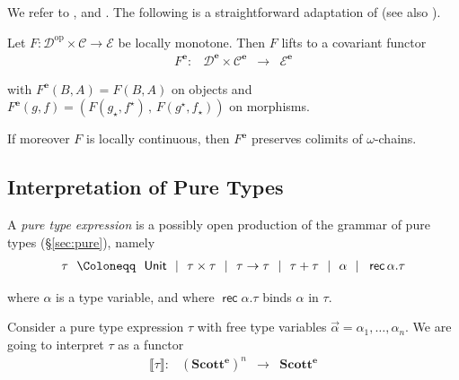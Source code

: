 \documentclass[%
  a4paper,
  UKenglish,
  cleveref,
  autoref,
  thm-restate,
  numberwithinsect,
]{lipics-v2021}
\newcommand\longto\longrightarrow
\newcommand\bnf\Coloneqq
\newcommand\gs{~~|~~}
\newcommand\I[1]{\llbracket #1 \rrbracket} %
\newcommand\cat\mathcal
\newcommand\op{{\mathrm{op}}}
\newcommand\ladj[1]{\ensuremath{{#1}^{\star}}}	%
\newcommand\radj[1]{\ensuremath{{#1}_{\star}}}	%
\newcommand\Scott{\mathbf{Scott}}
\newcommand\term[1]{\mathsf{#1}}
\newcommand\type[1]{\term{#1}}
\newcommand\arrow\to
\newcommand\Unit{\type{Unit}}
\newcommand\rec{\mathop{\type{rec}}}	%
\newcommand\TV{\alpha}		%
\newcommand\PT{\tau}		%
\newcommand\ep{{\mathbf{e}}}
\begin{document}
\noindent
We refer to \cite[Definition 5.2.5]{aj95chapter},
\cite[Definition 7.1.15]{ac98book}
and \cite[Definition 9.1]{streicher06book}.
%
The following is a straightforward adaptation of \cite[Proposition 7.1.19]{ac98book}
(see also \cite[Proposition 5.2.6]{aj95chapter}).

\begin{lemma}
\label{lem:proof:scott:lift}
Let
$F \colon \cat D^\op \times \cat C \to \cat E$
be locally monotone.
Then $F$ lifts to a covariant functor
\[
\begin{array}{*{4}{l}}
  F^\ep \colon
& \cat D^\ep \times \cat C^\ep
& \longto
& \cat E^\ep
\end{array}
\]


\noindent
with $F^\ep(B,A) = F(B,A)$ on objects and
$F^\ep(g,f) = (F(\radj g,\ladj f) \,,\, F(\ladj g,\radj f))$
on morphisms.

If moreover $F$ is locally continuous, then $F^\ep$
preserves colimits of $\omega$-chains.
\end{lemma}



\subsection{Interpretation of Pure Types}

A \emph{pure type expression} is a possibly open production of the
grammar of pure types (\S\ref{sec:pure}), namely
\[
\begin{array}{r @{\ \ }c@{\ \ } l}
    \PT
&   \bnf
&   \Unit
\gs \PT \times \PT
\gs \PT \arrow \PT
\gs \PT + \PT
\gs \TV
\gs \rec \TV.\PT 
\end{array}
\]

\noindent
where $\TV$ is a type variable,
and where $\rec\TV.\PT$ binds $\TV$ in $\PT$.

Consider a pure type expression $\PT$ with free
type variables $\vec \TV = \TV_1,\dots,\TV_n$.
We are going to interpret $\PT$ as a functor
\[
\begin{array}{*{4}{l}}
  \I\PT \colon
& \left( \Scott^\ep \right)^{n}
& \longto
& \Scott^\ep
\end{array}
\]
\end{document}
